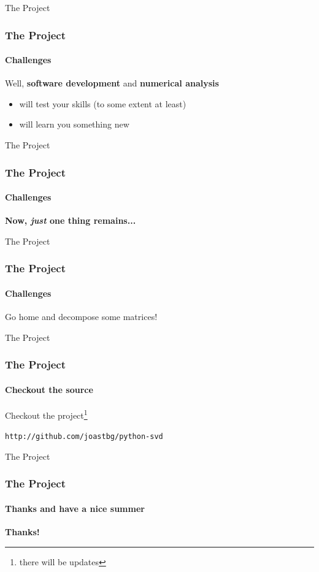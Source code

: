 \documentclass{beamer}
\begin{document}

\begin{frame}{The Project}

\frametitle{The Project}
\framesubtitle{Challenges}

Well, \textbf{software development} and \textbf{numerical analysis}
\begin{itemize}
\item will test your skills (to some extent at least)
\item will learn you something new
\end{itemize}

\end{frame}


\begin{frame}{The Project}

\frametitle{The Project}
\framesubtitle{Challenges}

\textbf{Now, \emph{just} one thing remains...}\\


\end{frame}


\begin{frame}{The Project}

\frametitle{The Project}
\framesubtitle{Challenges}

Go home and decompose some matrices!

\end{frame}


\begin{frame}{The Project}

\frametitle{The Project}
\framesubtitle{Checkout the source}

Checkout the project\footnote{there will be updates}
\begin{center}
\texttt{http://github.com/joastbg/python-svd}
\end{center}

\end{frame}


\begin{frame}{The Project}

\frametitle{The Project}
\framesubtitle{Thanks and have a nice summer}

\begin{center}
\textbf{Thanks!}
\end{center}

\end{frame}

\end{document}

